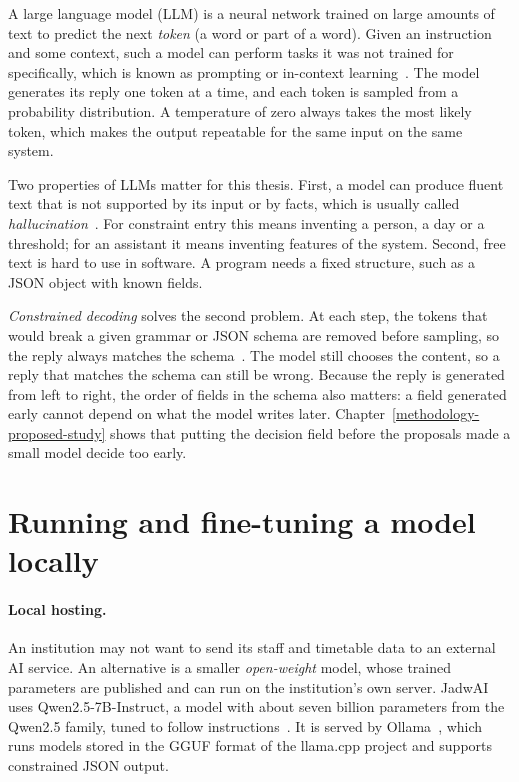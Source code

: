 A large language model (LLM) is a neural network trained on large amounts of text to predict the next \emph{token} (a word or part of a word). Given an instruction and some context, such a model can perform tasks it was not trained for specifically, which is known as prompting or in-context learning~\cite{brown2020fewshot}. The model generates its reply one token at a time, and each token is sampled from a probability distribution. A temperature of zero always takes the most likely token, which makes the output repeatable for the same input on the same system.

Two properties of LLMs matter for this thesis. First, a model can produce fluent text that is not supported by its input or by facts, which is usually called \emph{hallucination}~\cite{ji2023hallucination}. For constraint entry this means inventing a person, a day or a threshold; for an assistant it means inventing features of the system. Second, free text is hard to use in software. A program needs a fixed structure, such as a JSON object with known fields.

\emph{Constrained decoding} solves the second problem. At each step, the tokens that would break a given grammar or JSON schema are removed before sampling, so the reply always matches the schema~\cite{willard2023guided}. The model still chooses the content, so a reply that matches the schema can still be wrong. Because the reply is generated from left to right, the order of fields in the schema also matters: a field generated early cannot depend on what the model writes later. Chapter~\ref{methodology-proposed-study} shows that putting the decision field before the proposals made a small model decide too early.

\section{Running and fine-tuning a model locally}\label{bg-local}

\paragraph{Local hosting.} An institution may not want to send its staff and timetable data to an external AI service. An alternative is a smaller \emph{open-weight} model, whose trained parameters are published and can run on the institution's own server. JadwAI uses Qwen2.5-7B-Instruct, a model with about seven billion parameters from the Qwen2.5 family, tuned to follow instructions~\cite{qwen2024qwen25}. It is served by Ollama~\cite{ollama}, which runs models stored in the GGUF format of the llama.cpp project and supports constrained JSON output.

